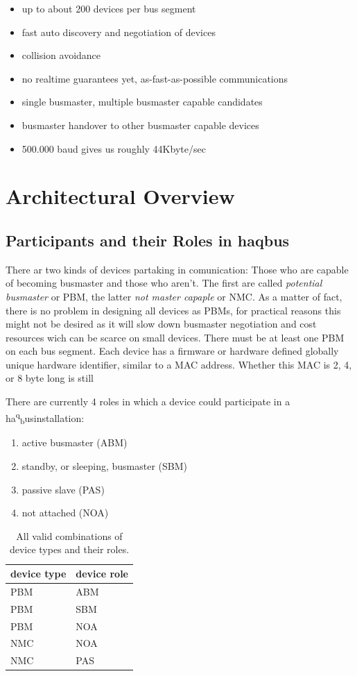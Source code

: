 \documentclass[a4paper,12pt]{scrartcl}
\newcommand{\haqbus}{ha\textsuperscript{q}\textsubscript{b}us}
\begin{document}
\begin{itemize}
\item up to about 200 devices per bus segment
\item fast auto discovery and negotiation of devices
\item collision avoidance
\item no realtime guarantees yet, as-fast-as-possible communications
\item single busmaster, multiple busmaster capable candidates
\item busmaster handover to other busmaster capable devices
\item 500.000 baud gives us roughly 44Kbyte/sec
\end{itemize}



\section{Architectural Overview}
\subsection{Participants and their Roles in haqbus}
There ar two kinds of devices partaking in comunication: Those who are capable of becoming busmaster and those who aren't.
The first are called \emph{potential busmaster} or PBM, the latter \emph{not master capaple} or NMC.
As a matter of fact, there is no problem in designing all devices as PBMs, for practical reasons this might not be desired as it will
slow down busmaster negotiation and cost resources wich can be scarce on small devices. 
There must be at least one PBM on each bus segment.
Each device has a firmware or hardware defined globally unique hardware identifier, similar to a MAC address.
Whether this MAC is 2, 4, or 8 byte long is still 

There are currently 4 roles in which a device could participate in a \haqbus installation:
\begin{enumerate}
\item active busmaster (ABM)
\item standby, or sleeping, busmaster (SBM)
\item passive slave (PAS)
\item not attached (NOA) 
\end{enumerate}

\begin{table}
  \centering
    \begin{tabular}{|l|l|}
        \hline
        device type & device role \\ \hline
        PBM         & ABM         \\ 
        PBM         & SBM         \\ 
        PBM         & NOA         \\
        NMC         & NOA     \\
        NMC         & PAS         \\
        	 
        \hline
    \end{tabular}
    \caption{%
    All valid combinations of device types and their roles.    
    }
\end{table}
\end{document}

